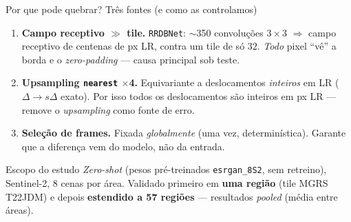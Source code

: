 \documentclass[aspectratio=169]{beamer}
\begin{document}
\begin{frame}{Por que pode quebrar? Três fontes (e como as controlamos)}

  \begin{enumerate}
    \item \textbf{Campo receptivo $\gg$ tile.} \texttt{RRDBNet}: $\sim$350 convoluções
          $3\times3$ $\Rightarrow$ campo receptivo de centenas de px LR, contra um tile
          de só $32$. \emph{Todo} pixel ``vê'' a borda e o \textit{zero-padding} ---
          \textcolor{loss}{causa principal sob teste}.
    \item \textbf{Upsampling \texttt{nearest} $\times$4.} Equivariante a deslocamentos
          \emph{inteiros} em LR ($\Delta\to s\Delta$ exato). \textcolor{gain}{Por isso
          todos os deslocamentos são inteiros em px LR} --- remove o \textit{upsampling}
          como fonte de erro.
    \item \textbf{Seleção de frames.} Fixada \emph{globalmente} (uma vez,
          determinística). \textcolor{gain}{Garante que a diferença vem do modelo, não
          da entrada.}
  \end{enumerate}

  \vspace{0.5em}
  \begin{block}{Escopo do estudo}
    \emph{Zero-shot} (pesos pré-treinados \texttt{esrgan\_8S2}, sem retreino), Sentinel-2,
    8 cenas por área. Validado primeiro em \textbf{uma região} (tile MGRS T22JDM) e
    depois \textcolor{gain}{\textbf{estendido a 57 regiões}} --- resultados
    \emph{pooled} (média entre áreas).
  \end{block}

\end{frame}
\end{document}
